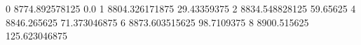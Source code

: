 0 8774.892578125 0.0
1 8804.326171875 29.43359375
2 8834.548828125 59.65625
4 8846.265625 71.373046875
6 8873.603515625 98.7109375
8 8900.515625 125.623046875
